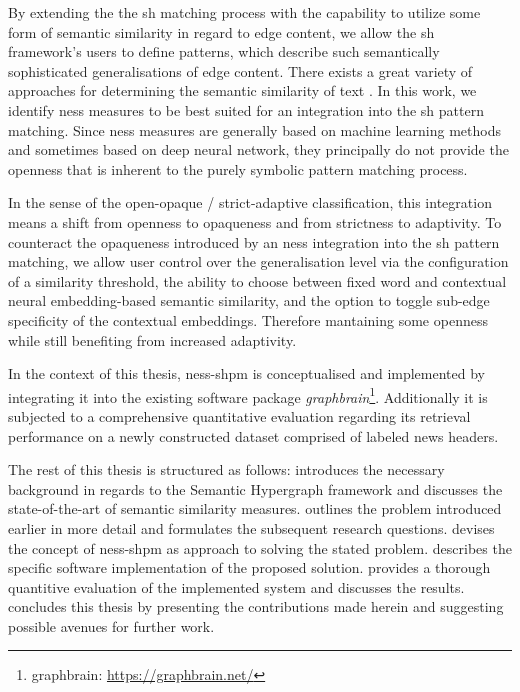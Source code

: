 \documentclass[11pt, numbers=noenddot]{scrreprt}
\let\cite\parencite  %
\begin{document}
By extending the the \gls{sh} matching process with the capability to utilize some form of semantic similarity in regard to edge content, we allow the \gls{sh} framework's users to define patterns, which describe such semantically sophisticated generalisations of edge content.
There exists a great variety of approaches for determining the semantic similarity of text \cite{harispeSemanticSimilarityNatural2015, chandrasekaranEvolutionSemanticSimilarity2021}. In this work, we identify \gls{ness} measures to be best suited for an integration into the \gls{sh} pattern matching. Since \gls{ness} measures are generally based on machine learning methods and sometimes based on deep neural network, they principally do not provide the openness that is inherent to the purely symbolic pattern matching process.

 In the sense of the open-opaque / strict-adaptive classification, this integration means a shift from openness to opaqueness and from strictness to adaptivity. To counteract the opaqueness introduced by an \gls{ness} integration into the \gls{sh} pattern matching, we allow user control over the generalisation level via the configuration of a similarity threshold, the ability to choose between fixed word and contextual neural embedding-based semantic similarity, and the option to toggle sub-edge specificity of the contextual embeddings. Therefore mantaining some openness while still benefiting from increased adaptivity.

In the context of this thesis, \gls{ness-shpm} is conceptualised and implemented by integrating it into the existing software package \textit{graphbrain}\footnote{graphbrain: \url{https://graphbrain.net/}}. Additionally it is subjected to a comprehensive quantitative evaluation regarding its retrieval performance on a newly constructed dataset comprised of labeled news headers.

The rest of this thesis is structured as follows:  introduces the necessary background in regards to the Semantic Hypergraph framework and discusses the state-of-the-art of semantic similarity measures.  outlines the problem introduced earlier in more detail and formulates the subsequent research questions.  devises the concept of \gls{ness-shpm} as approach to solving the stated problem.  describes the specific software implementation of the proposed solution.  provides a thorough quantitive evaluation of the implemented system and discusses the results. 
 concludes this thesis by presenting the contributions made herein and suggesting possible avenues for further work.
\end{document}
